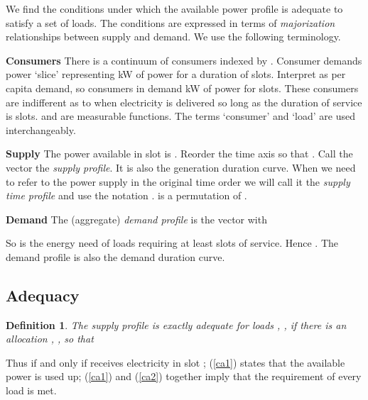 \documentclass[10pt,draftcls,onecolumn]{IEEEtran}
\newtheorem{definition}{Definition}
\newcounter{l1}
\newcounter{l2}
\newcounter{l3}
\begin{document}
We  find the conditions under which  the available power profile is adequate to satisfy a set of loads.
The  conditions are expressed  in terms of \textit{majorization} relationships between supply and demand. 
We use the following terminology.




\textbf{Consumers} There is a continuum of consumers indexed by . 
 Consumer  demands power `slice'  representing  kW of power for a duration of  slots. Interpret  as per capita demand, so  consumers in  demand   kW of power for  slots.  These consumers are indifferent as to when electricity is delivered so long as  the duration of service is  slots.  and  are  measurable functions. 
The terms `consumer' and `load' are used interchangeably. 


\textbf{Supply} 
The  power available in slot  is .  Reorder the time axis so that .  Call the vector  the \textit{supply profile}. It is also the generation duration curve.  When we need to refer to the power supply in the original time order we will call it
the \textit{supply time profile} and use the notation .   is a permutation of .


\textbf{Demand} The (aggregate) \emph{demand profile} is the vector  with 
  
So  is the energy need of  loads requiring at least  slots of service.  Hence .  The demand profile is also the demand duration curve.


\subsection{Adequacy}
\begin{definition}
The supply profile  is  \emph{exactly adequate} for loads , , if there is an allocation  , ,   so that

\end{definition}
\noindent 
Thus
 if and only if  receives electricity in slot ;
 (\ref{ca1}) states that  the available power is used up;    (\ref{ca1}) and  (\ref{ca2}) together imply that the requirement of every load is met.
\end{document}
